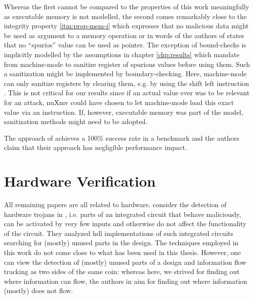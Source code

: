 Whereas the first cannot be compared to the properties of this work meaningfully as executable memory is not modelled, the second comes remarkably close to the integrity property \ref{itm:prop-mem-i} which expresses that no malicious data might be used as argument to a memory operation or in words of the authors of \cite{SuhLZD04} states that no \enquote{spurios} value can be used as pointer.
The exception of bound-checks is implicitly modelled by the  assumptions in chapter \ref{chp:results} which mandate from machine-mode to sanitize register of spurious values before using them.
Such a sanitization might be implemented by boundary-checking.
Here, machine-mode can only sanitize registers by clearing them, e.g. by using the shift left instruction .
This is not critical for our results since if an actual value ever was to be relevant for an attack, nuXmv could have chosen to let machine-mode load this exact value via an  instruction.
If, however, executable memory was part of the model, sanitization methods might need to be adopted.

The approach of \cite{SuhLZD04} achieves a 100\% success rate in a benchmark and the authors claim that their approach has negligible performance impact.

\section{Hardware Verification}

All remaining papers are all related to hardware.
\citeauthor{Zhang15} consider the detection of hardware trojans in  \cite{Zhang15}, i.e. parts of an integrated circuit that behave maliciously, can be activated by very few inputs and otherwise do not affect the functionality of the circuit.
They analyzed \gls{hdl} implementations of such integrated circuits searching for (mostly) unused parts in the design.
The techniques employed in this work do not come close to what has been used in this thesis.
However, one can view the detection of (mostly) unused parts of a design and information flow tracking as two sides of the same coin: whereas here, we strived for finding out where information can flow, the authors in \cite{Zhang15} aim for finding out where information (mostly) does not flow.

